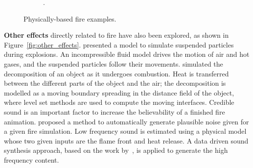 \begin{figure}[htpb!]
\begin{subfigure}[t]{0.3\textwidth}
                \caption{\cite{Hong:2007}.}
        \end{subfigure} 
        \caption{Physically-based fire examples.}
        \label{fig:physically_based}
\end{figure}
 
\textbf{Other effects} directly related to fire have also been explored, as shown in Figure~\ref{fig:other_effects}.
\cite{Feldman:2003} presented a model to simulate suspended particles during explosions.
An incompressible fluid model drives the motion of air and hot gases, and the suspended particles follow their movements.
\cite{Melek:2005} simulated the decomposition of an object as it undergoes combustion.
Heat is transferred between the different parts of the object and the air; the decomposition is modelled as a moving boundary spreading in the distance field of the object, where level set methods are used to compute the moving interfaces.
Credible sound is an important factor to increase the believability of a finished fire animation.
\cite{Chadwick:2011} proposed a method to automatically generate plausible noise given for a given fire simulation.
Low frequency sound is estimated using a physical model whose two given inputs are the flame front and heat release.
A data driven sound synthesis approach, based on the work by~\cite{Wei:2000}, is applied to generate the high frequency content.

